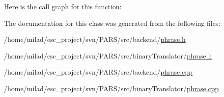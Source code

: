 Here is the call graph for this function:




The documentation for this class was generated from the following files:\begin{DoxyCompactItemize}
\item 
/home/milad/esc\_\-project/svn/PARS/src/backend/\hyperlink{backend_2phrase_8h}{phrase.h}\item 
/home/milad/esc\_\-project/svn/PARS/src/binaryTranslator/\hyperlink{binaryTranslator_2phrase_8h}{phrase.h}\item 
/home/milad/esc\_\-project/svn/PARS/src/backend/\hyperlink{backend_2phrase_8cpp}{phrase.cpp}\item 
/home/milad/esc\_\-project/svn/PARS/src/binaryTranslator/\hyperlink{binaryTranslator_2phrase_8cpp}{phrase.cpp}\end{DoxyCompactItemize}
